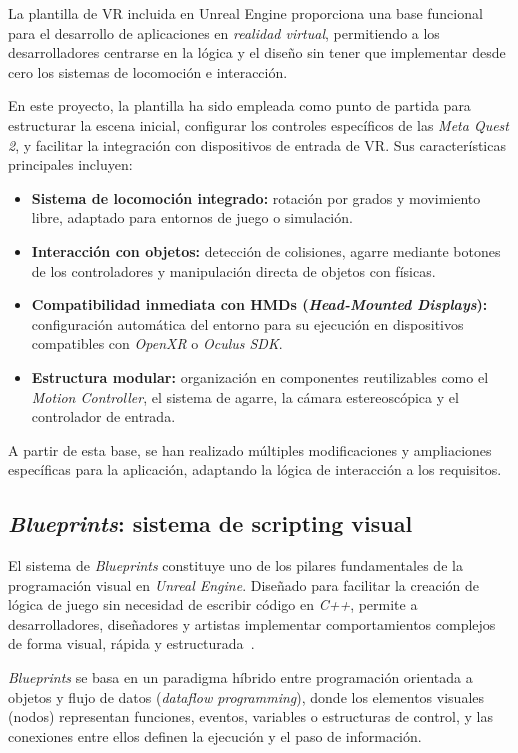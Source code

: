 La plantilla de VR incluida en Unreal Engine proporciona una base funcional para el desarrollo de aplicaciones en \textit{realidad virtual}, permitiendo a los desarrolladores centrarse en la lógica y el diseño sin tener que implementar desde cero los sistemas de locomoción e interacción.

En este proyecto, la plantilla ha sido empleada como punto de partida para estructurar la escena inicial, configurar los controles específicos de las \textit{Meta Quest 2}, y facilitar la integración con dispositivos de entrada de VR. Sus características principales incluyen:

\begin{itemize}
  \item \textbf{Sistema de locomoción integrado:} rotación por grados y movimiento libre, adaptado para entornos de juego o simulación.
  \item \textbf{Interacción con objetos:} detección de colisiones, agarre mediante botones de los controladores y manipulación directa de objetos con físicas.
  \item \textbf{Compatibilidad inmediata con HMDs (\textit{Head-Mounted Displays}):} configuración automática del entorno para su ejecución en dispositivos compatibles con \textit{OpenXR} o \textit{Oculus SDK}.
  \item \textbf{Estructura modular:} organización en componentes reutilizables como el \textit{Motion Controller}, el sistema de agarre, la cámara estereoscópica y el controlador de entrada.
\end{itemize}

A partir de esta base, se han realizado múltiples modificaciones y ampliaciones específicas para la aplicación, adaptando la lógica de interacción a los requisitos.

\subsection{\textit{Blueprints}: sistema de scripting visual}

El sistema de \textit{Blueprints} constituye uno de los pilares fundamentales de la programación visual en \textit{Unreal Engine}. Diseñado para facilitar la creación de lógica de juego sin necesidad de escribir código en \textit{C++}, permite a desarrolladores, diseñadores y artistas implementar comportamientos complejos de forma visual, rápida y estructurada~\cite{epicblueprintdocs}.

\textit{Blueprints} se basa en un paradigma híbrido entre programación orientada a objetos y flujo de datos (\textit{dataflow programming}), donde los elementos visuales (nodos) representan funciones, eventos, variables o estructuras de control, y las conexiones entre ellos definen la ejecución y el paso de información.

